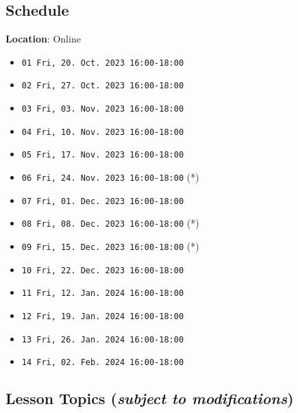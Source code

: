 \documentclass[
]{book}
\begin{document}
\hypertarget{schedule}{%
\subsection*{Schedule}\label{schedule}}

\textbf{Location}: Online

\begin{itemize}
\item
  \texttt{01\ Fri,\ 20.\ Oct.\ 2023\ 16:00-18:00}
\item
  \texttt{02\ Fri,\ 27.\ Oct.\ 2023\ 16:00-18:00}
\item
  \texttt{03\ Fri,\ 03.\ Nov.\ 2023\ 16:00-18:00}
\item
  \texttt{04\ Fri,\ 10.\ Nov.\ 2023\ 16:00-18:00}
\item
  \texttt{05\ Fri,\ 17.\ Nov.\ 2023\ 16:00-18:00}
\item
  \texttt{06\ Fri,\ 24.\ Nov.\ 2023\ 16:00-18:00} (*)
\item
  \texttt{07\ Fri,\ 01.\ Dec.\ 2023\ 16:00-18:00}
\item
  \texttt{08\ Fri,\ 08.\ Dec.\ 2023\ 16:00-18:00} (*)
\item
  \texttt{09\ Fri,\ 15.\ Dec.\ 2023\ 16:00-18:00} (*)
\item
  \texttt{10\ Fri,\ 22.\ Dec.\ 2023\ 16:00-18:00}
\item
  \texttt{11\ Fri,\ 12.\ Jan.\ 2024\ 16:00-18:00}
\item
  \texttt{12\ Fri,\ 19.\ Jan.\ 2024\ 16:00-18:00}
\item
  \texttt{13\ Fri,\ 26.\ Jan.\ 2024\ 16:00-18:00}
\item
  \texttt{14\ Fri,\ 02.\ Feb.\ 2024\ 16:00-18:00}
\end{itemize}

\hypertarget{lesson-topics-subject-to-modifications}{%
\subsection*{\texorpdfstring{Lesson Topics (\emph{subject to modifications})}{Lesson Topics (subject to modifications)}}\label{lesson-topics-subject-to-modifications}}
\end{document}
